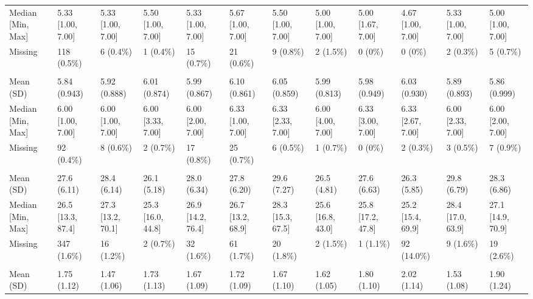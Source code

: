 \documentclass[
  single column]{article}
\begin{document}
\begin{landscape}
\begin{tabular}[t]{llllllllllll}
\hspace{1em}Median [Min, Max] & 5.33 [1.00, 7.00] & 5.33 [1.00, 7.00] & 5.50 [1.00, 7.00] & 5.33 [1.00, 7.00] & 5.67 [1.00, 7.00] & 5.50 [1.00, 7.00] & 5.00 [1.00, 7.00] & 5.00 [1.67, 7.00] & 4.67 [1.00, 7.00] & 5.33 [1.00, 7.00] & 5.00 [1.00, 7.00]\\
\hspace{1em}Missing & 118 (0.5\%) & 6 (0.4\%) & 1 (0.4\%) & 15 (0.7\%) & 21 (0.6\%) & 9 (0.8\%) & 2 (1.5\%) & 0 (0\%) & 0 (0\%) & 2 (0.3\%) & 5 (0.7\%)\\
\addlinespace[0.3em]
\multicolumn{12}{l}{\textbf{gratitude}}\\
\hspace{1em}Mean (SD) & 5.84 (0.943) & 5.92 (0.888) & 6.01 (0.874) & 5.99 (0.867) & 6.10 (0.861) & 6.05 (0.859) & 5.99 (0.813) & 5.98 (0.949) & 6.03 (0.930) & 5.89 (0.893) & 5.86 (0.999)\\
\hspace{1em}Median [Min, Max] & 6.00 [1.00, 7.00] & 6.00 [1.00, 7.00] & 6.00 [3.33, 7.00] & 6.00 [2.00, 7.00] & 6.33 [1.00, 7.00] & 6.33 [2.33, 7.00] & 6.00 [4.00, 7.00] & 6.33 [3.00, 7.00] & 6.33 [2.67, 7.00] & 6.00 [2.33, 7.00] & 6.00 [2.00, 7.00]\\
\hspace{1em}Missing & 92 (0.4\%) & 8 (0.6\%) & 2 (0.7\%) & 17 (0.8\%) & 25 (0.7\%) & 6 (0.5\%) & 1 (0.7\%) & 0 (0\%) & 2 (0.3\%) & 3 (0.5\%) & 7 (0.9\%)\\
\addlinespace[0.3em]
\multicolumn{12}{l}{\textbf{hlth\_bmi}}\\
\hspace{1em}Mean (SD) & 27.6 (6.11) & 28.4 (6.14) & 26.1 (5.18) & 28.0 (6.34) & 27.8 (6.20) & 29.6 (7.27) & 26.5 (4.81) & 27.6 (6.63) & 26.3 (5.85) & 29.8 (6.79) & 28.3 (6.86)\\
\hspace{1em}Median [Min, Max] & 26.5 [13.3, 87.4] & 27.3 [13.2, 70.1] & 25.3 [16.0, 44.8] & 26.9 [14.2, 76.4] & 26.7 [13.2, 68.9] & 28.3 [15.3, 67.5] & 25.6 [16.8, 43.0] & 25.8 [17.2, 47.8] & 25.2 [15.4, 69.9] & 28.4 [17.0, 63.9] & 27.1 [14.9, 70.9]\\
\hspace{1em}Missing & 347 (1.6\%) & 16 (1.2\%) & 2 (0.7\%) & 32 (1.6\%) & 61 (1.7\%) & 20 (1.8\%) & 2 (1.5\%) & 1 (1.1\%) & 92 (14.0\%) & 9 (1.6\%) & 19 (2.6\%)\\
\addlinespace[0.3em]
\multicolumn{12}{l}{\textbf{hlth\_fatigue}}\\
\hspace{1em}Mean (SD) & 1.75 (1.12) & 1.47 (1.06) & 1.73 (1.13) & 1.67 (1.09) & 1.72 (1.09) & 1.67 (1.10) & 1.62 (1.05) & 1.80 (1.10) & 2.02 (1.14) & 1.53 (1.08) & 1.90 (1.24)\\

\end{tabular}
\end{landscape}
\end{document}
